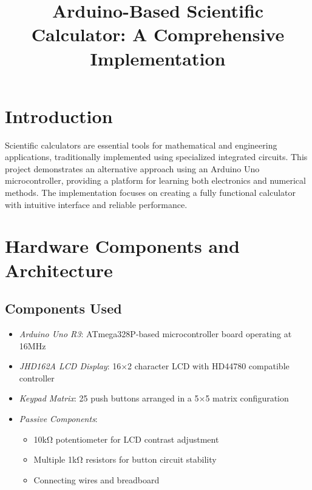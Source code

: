 \documentclass{article}
\title{Arduino-Based Scientific Calculator: A Comprehensive Implementation}
\author{}
\date{}
\begin{document}
\maketitle

\section{Introduction}
Scientific calculators are essential tools for mathematical and engineering applications, traditionally implemented using specialized integrated circuits. This project demonstrates an alternative approach using an Arduino Uno microcontroller, providing a platform for learning both electronics and numerical methods. The implementation focuses on creating a fully functional calculator with intuitive interface and reliable performance.

\section{Hardware Components and Architecture}
\subsection{Components Used}
\begin{itemize}[leftmargin=*]
    \item \textit{Arduino Uno R3}: ATmega328P-based microcontroller board operating at 16MHz
    \item \textit{JHD162A LCD Display}: 16×2 character LCD with HD44780 compatible controller
    \item \textit{Keypad Matrix}: 25 push buttons arranged in a 5×5 matrix configuration
    \item \textit{Passive Components}:
    \begin{itemize}[leftmargin=*]
        \item 10kΩ potentiometer for LCD contrast adjustment
        \item Multiple 1kΩ resistors for button circuit stability
        \item Connecting wires and breadboard
    \end{itemize}
\end{itemize}
\end{document}
